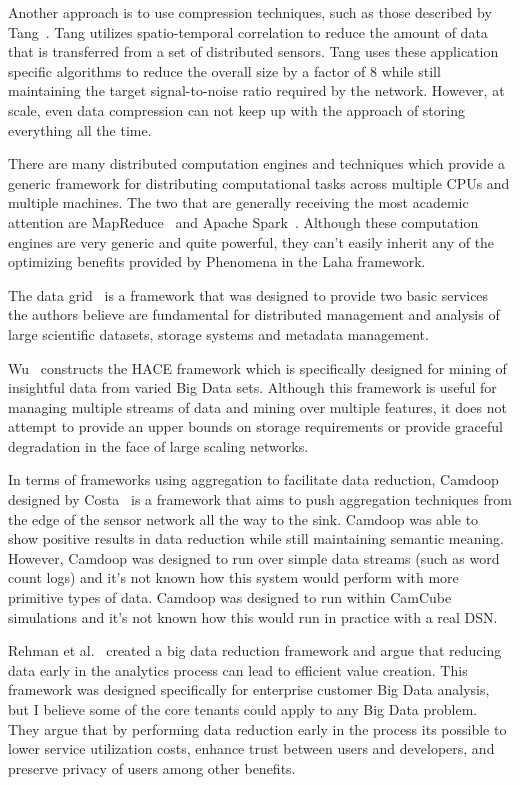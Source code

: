 Another approach is to use compression techniques, such as those described by Tang~\cite{tang2004compression}. Tang utilizes spatio-temporal correlation to reduce the amount of data that is transferred from a set of distributed sensors. Tang uses these application specific algorithms to reduce the overall size by a factor of 8 while still maintaining the target signal-to-noise ratio required by the network. However, at scale, even data compression can not keep up with the approach of storing everything all the time.

There are many distributed computation engines and techniques which provide a generic framework for distributing computational tasks across multiple CPUs and multiple machines. The two that are generally receiving the most academic attention are MapReduce~\cite{dean2008mapreduce} and Apache Spark~\cite{zaharia2016apache}. Although these computation engines are very generic and quite powerful, they can't easily inherit any of the optimizing benefits provided by Phenomena in the Laha framework.

The data grid~\cite{chervenak2000data} is a framework that was designed to provide two basic services the authors believe are fundamental for distributed management and analysis of large scientific datasets, storage systems and metadata management.

Wu~\cite{wu2014data} constructs the HACE framework which is specifically designed for mining of insightful data from varied Big Data sets. Although this framework is useful for managing multiple streams of data and mining over multiple features, it does not attempt to provide an upper bounds on storage requirements or provide graceful degradation in the face of large scaling networks.

In terms of frameworks using aggregation to facilitate data reduction, Camdoop designed by Costa~\cite{costa2012camdoop} is a framework that aims to push aggregation techniques from the edge of the sensor network all the way to the sink. Camdoop was able to show positive results in data reduction while still maintaining semantic meaning. However, Camdoop was designed to run over simple data streams (such as word count logs) and it's not known how this system would perform with more primitive types of data. Camdoop was designed to run within CamCube simulations and it's not known how this would run in practice with a real DSN.

Rehman et al.~\cite{ur2016big} created a big data reduction framework and argue that reducing data early in the analytics process can lead to efficient value creation. This framework was designed specifically for enterprise customer Big Data analysis, but I believe some of the core tenants could apply to any Big Data problem. They argue that by performing data reduction early in the process its possible to lower service utilization costs, enhance trust between users and developers, and preserve privacy of users among other benefits.

